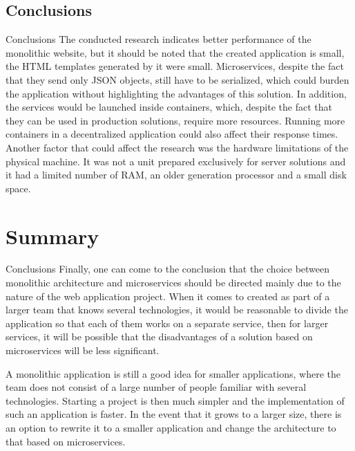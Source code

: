 \documentclass{beamer}
\begin{document}
	\subsection{Conclusions}
	\begin{frame}{Conclusions}
	The conducted research indicates better performance of the monolithic website, but it should be noted that the created application is small, the HTML templates generated by it were small. Microservices, despite the fact that they send only JSON objects, still have to be serialized, which could burden the application without highlighting the advantages of this solution. In addition, the services would be launched inside containers, which, despite the fact that they can be used in production solutions, require more resources. Running more containers in a decentralized application could also affect their response times. Another factor that could affect the research was the hardware limitations of the physical machine. It was not a unit prepared exclusively for server solutions and it had a limited number of RAM, an older generation processor and a small disk space.
	\end{frame}
	
	\section{Summary}
	\begin{frame}{Conclusions}
	Finally, one can come to the conclusion that the choice between monolithic architecture and microservices should be directed mainly due to the nature of the web application project. When it comes to created as part of a larger team that knows several technologies, it would be reasonable to divide the application so that each of them works on a separate service, then for larger services, it will be possible that the disadvantages of a solution based on microservices will be less significant.
	
	 A monolithic application is still a good idea for smaller applications, where the team does not consist of a large number of people familiar with several technologies. Starting a project is then much simpler and the implementation of such an application is faster. In the event that it grows to a larger size, there is an option to rewrite it to a smaller application and change the architecture to that based on microservices.	
	\end{frame}

	
\end{document}
